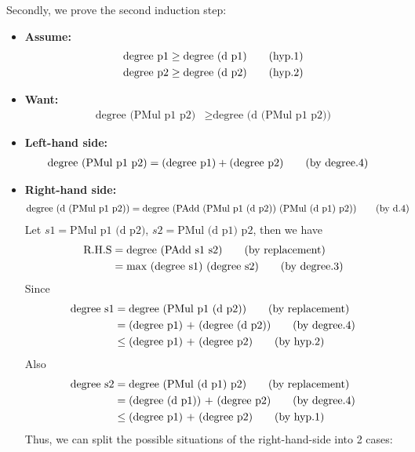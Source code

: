\documentclass[11pt]{article}
\theoremstyle{definition}
\begin{document}
\begin{enumerate}
\begin{enumerate}[(a)]
Secondly, we prove the second induction step:
\begin{itemize}
\item \textbf{Assume:}
\begin{align*}
\text{degree p1} &\geq \text{degree (d p1)} \tag{\text{hyp.1}} \\
\text{degree p2} &\geq \text{degree (d p2)} \tag{\text{hyp.2}}
\end{align*}
\item \textbf{Want:}
\begin{align*}
\text{degree (PMul p1 p2)} &\geq \text{degree (d (PMul p1 p2))}
\end{align*}
\item \textbf{Left-hand side:}
\begin{align*}
\text{degree (PMul p1 p2)} &= \text{(degree p1)} + \text{(degree p2)} \tag{\text{by degree.4}}
\end{align*}
\item \textbf{Right-hand side:}
\begin{align*}
\text{degree (d (PMul p1 p2))} &= \text{degree (PAdd (PMul p1 (d p2)) (PMul (d p1) p2))} \tag{\text{by d.4}}
\end{align*}
Let $s1 = \text{PMul p1 (d p2)}$, $s2 = \text{PMul (d p1) p2}$, then we have
\begin{align*}
\text{R.H.S} &= \text{degree (PAdd s1 s2)} \tag{\text{by replacement}} \\
             &= \text{max (degree s1) (degree s2)} \tag{\text{by degree.3}}
\end{align*}
Since
\begin{align*}
\text{degree s1} &= \text{degree (PMul p1 (d p2))} \tag{\text{by replacement}} \\
				 &= \text{(degree p1) + (degree (d p2))} \tag{\text{by degree.4}} \\
				 &\leq \text{(degree p1) + (degree p2)} \tag{\text{by hyp.2}}
\end{align*}
Also
\begin{align*}
\text{degree s2} &= \text{degree (PMul (d p1) p2)} \tag{\text{by replacement}} \\
				 &= \text{(degree (d p1)) + (degree p2)} \tag{\text{by degree.4}} \\
				 &\leq \text{(degree p1) + (degree p2)} \tag{\text{by hyp.1}}
\end{align*}
Thus, we can split the possible situations of the right-hand-side into 2 cases:


\end{itemize}
\end{enumerate}
\end{enumerate}
\end{document}
